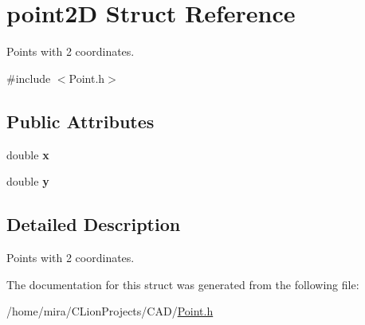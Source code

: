 \hypertarget{structpoint2D}{}\section{point2D Struct Reference}
\label{structpoint2D}


Points with 2 coordinates.  




{\ttfamily \#include $<$Point.\+h$>$}

\subsection*{Public Attributes}
\begin{DoxyCompactItemize}
\item 
double {\bfseries x}\hypertarget{structpoint2D_ade69032d2a9596dfd5c2b3ee29551569}{}\label{structpoint2D_ade69032d2a9596dfd5c2b3ee29551569}

\item 
double {\bfseries y}\hypertarget{structpoint2D_aeb2d0d7a7919611c9b6022fec6ca0bc6}{}\label{structpoint2D_aeb2d0d7a7919611c9b6022fec6ca0bc6}

\end{DoxyCompactItemize}


\subsection{Detailed Description}
Points with 2 coordinates. 

The documentation for this struct was generated from the following file\+:\begin{DoxyCompactItemize}
\item 
/home/mira/\+C\+Lion\+Projects/\+C\+A\+D/\hyperlink{Point_8h}{Point.\+h}\end{DoxyCompactItemize}
